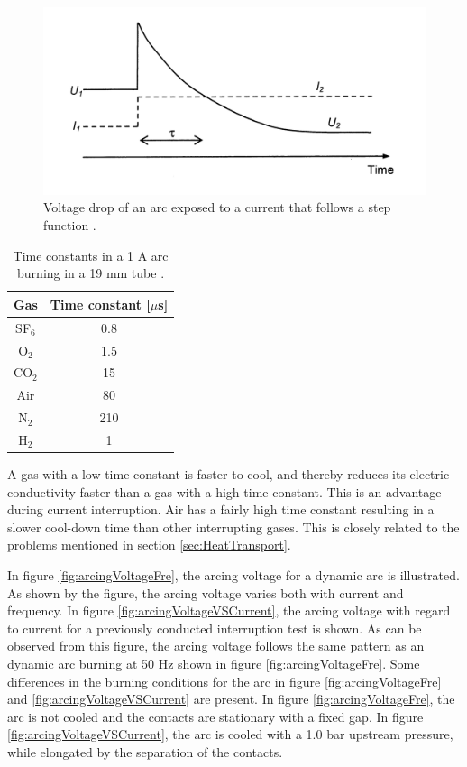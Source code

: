 \documentclass[10pt,b5paper,twoside]{article}
\begin{document}
\begin{figure}[H]
\centering
\includegraphics[scale=1]{Bilder/Theory/timeConstants.png}
\caption{Voltage drop of an arc exposed to a current that follows a step function  \cite{bib:HVEbreak}.} \label{fig:timeConstantStep}
\end{figure}

\begin{table}[H]
\center
\caption{Time constants in a 1 A arc burning in a 19 mm tube \cite{bib:HVEbreak}. }
\begin{tabular}{|c|c|}
\hline 
Gas & Time constant [$\mu$s] \\ 
\hline 
SF$_6$ & 0.8 \\ 
\hline
O$_2$ & 1.5 \\
\hline
CO$_2$ & 15 \\
\hline
Air & 80 \\
\hline
N$_2$ & 210 \\
\hline
H$_2$ & 1 \\
\hline
\end{tabular} 
\label{tab:timeConstants}
\end{table}

A gas with a low time constant is faster to cool, and thereby reduces its electric conductivity faster than a gas with a high time constant. This is an advantage during current interruption. Air has a fairly high time constant resulting in a slower cool-down time than other interrupting gases. This is closely related to the problems mentioned in section \ref{sec:HeatTransport}. 

In figure \ref{fig:arcingVoltageFre}, the arcing voltage for a dynamic arc is illustrated. As shown by the figure, the arcing voltage varies both with current and frequency. In figure \ref{fig:arcingVoltageVSCurrent}, the arcing voltage with regard to current for a previously conducted interruption test is shown. As can be observed from this figure, the arcing voltage follows the same pattern as an dynamic arc burning at 50 Hz shown in figure \ref{fig:arcingVoltageFre}. Some differences in the burning conditions for the arc in figure \ref{fig:arcingVoltageFre} and \ref{fig:arcingVoltageVSCurrent} are present. In figure \ref{fig:arcingVoltageFre}, the arc is not cooled and the contacts are stationary with a fixed gap. In figure \ref{fig:arcingVoltageVSCurrent}, the arc is cooled with a 1.0 bar upstream pressure, while elongated by the separation of the contacts.
\end{document}
